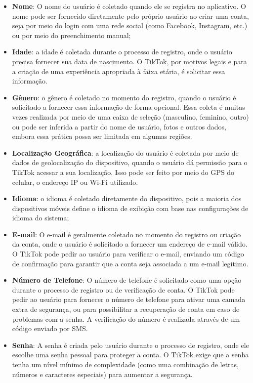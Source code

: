 \begin{itemize}
    \item \textbf{Nome}: O nome do usuário é coletado quando ele se registra no aplicativo. O nome pode ser fornecido diretamente pelo próprio usuário ao criar uma conta, seja por meio do login com uma rede social (como Facebook, Instagram, etc.) ou por meio do preenchimento manual;
    \item \textbf{Idade}: a idade é coletada durante o processo de registro, onde o usuário precisa fornecer sua data de nascimento. O TikTok, por motivos legais e para a criação de uma experiência apropriada à faixa etária, é solicitar essa informação.
    \item \textbf{Gênero}: o gênero é coletado no momento do registro, quando o usuário é solicitado a fornecer essa informação de forma opcional. Essa coleta é muitas vezes realizada por meio de uma caixa de seleção (masculino, feminino, outro) ou pode ser inferida a partir do nome de usuário, fotos e outros dados, embora essa prática possa ser limitada em algumas regiões.
    \item \textbf{Localização Geográfica}: a localização do usuário é coletada por meio de dados de geolocalização do dispositivo, quando o usuário dá permissão para o TikTok acessar a sua localização. Isso pode ser feito por meio do GPS do celular, o endereço IP ou Wi-Fi utilizado.
    \item \textbf{Idioma}: o idioma é coletado diretamente do dispositivo, pois a maioria dos dispositivos móveis define o idioma de exibição com base nas configurações de idioma do sistema;

    \item \textbf{E-mail}: O e-mail é geralmente coletado no momento do registro ou criação da conta, onde o usuário é solicitado a fornecer um endereço de e-mail válido. O TikTok pode pedir ao usuário para verificar o e-mail, enviando um código de confirmação para garantir que a conta seja associada a um e-mail legítimo.
    \item \textbf{Número de Telefone}: O número de telefone é solicitado como uma opção durante o processo de registro ou de verificação de conta. O TikTok pode pedir ao usuário para fornecer o número de telefone para ativar uma camada extra de segurança, ou para possibilitar a recuperação de conta em caso de problemas com a senha. A verificação do número é realizada através de um código enviado por SMS.
    \item \textbf{Senha}: A senha é criada pelo usuário durante o processo de registro, onde ele escolhe uma senha pessoal para proteger a conta. O TikTok exige que a senha tenha um nível mínimo de complexidade (como uma combinação de letras, números e caracteres especiais) para aumentar a segurança.
\end{itemize}



